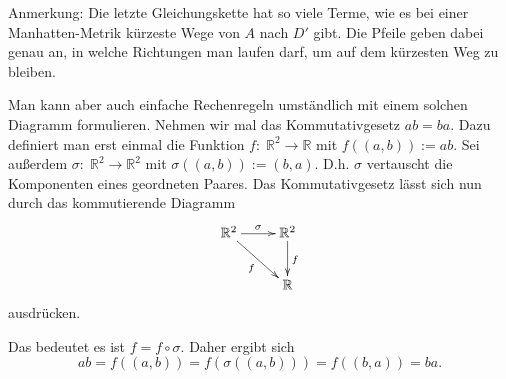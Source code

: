 \documentclass[a4paper,12pt,fleqn]{article}
\begin{document}
Anmerkung: Die letzte Gleichungskette hat so viele Terme,
wie es bei einer Manhatten-Metrik kürzeste
Wege von \(A\) nach \(D'\) gibt. Die Pfeile
geben dabei genau an, in welche Richtungen
man laufen darf, um auf dem kürzesten Weg
zu bleiben.

Man kann aber auch einfache Rechenregeln umständlich
mit einem solchen Diagramm formulieren. Nehmen wir mal
das Kommutativgesetz \(ab=ba\). Dazu definiert man erst einmal
die Funktion \(f{:}\;\mathbb R^2\rightarrow\mathbb R\) mit
\(f((a,b)):=ab\). Sei außerdem
\(\sigma{:}\;\mathbb R^2\rightarrow\mathbb R^2\)
mit \(\sigma((a,b)):=(b,a)\). D.h. \(\sigma\) vertauscht die
Komponenten eines geordneten Paares. Das Kommutativgesetz lässt sich
nun durch das kommutierende Diagramm
\[\xymatrix{\mathbb R^2 \ar[r]^\sigma \ar[dr]_f &\ar[d]^f \mathbb R^2\\
& \mathbb R}\]
ausdrücken.

Das bedeutet es ist \(f=f\circ\sigma\). Daher ergibt sich
\[ab = f((a,b))=f(\sigma((a,b))) = f((b,a)) = ba.\]
\end{document}
